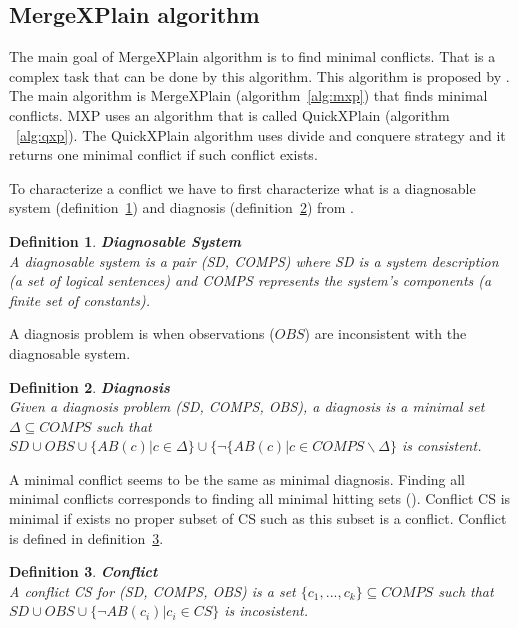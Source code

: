 \documentclass[12pt,a4paper]{article}
\newtheorem{definition}{Definition}[subsection]
\begin{document}
\subsection{MergeXPlain algorithm}
The main goal of MergeXPlain algorithm is to find minimal conflicts. That is a complex task that can be done by this algorithm. This algorithm is proposed by \citep{MXP}. The main algorithm is MergeXPlain (algorithm~\ref{alg:mxp}) that finds minimal conflicts. MXP uses an algorithm that is called QuickXPlain (algorithm ~\ref{alg:qxp}). The QuickXPlain algorithm uses divide and conquere strategy and it returns one minimal conflict if such conflict exists. 

To characterize a conflict we have to first characterize what is a diagnosable system (definition~\ref{def:diagnosableSystem}) and diagnosis (definition~\ref{def:diagnosis}) from \citep{reiterHS}.

\begin{definition}{\textbf{Diagnosable System}} \\
	\label{def:diagnosableSystem}
	\noindent A diagnosable system is a pair (SD, COMPS) where SD is a system description (a set of logical sentences) and COMPS represents the system's components (a finite set of constants).
\end{definition}

A diagnosis problem is when observations ($OBS$) are inconsistent with the diagnosable system.

\begin{definition}{\textbf{Diagnosis}} \\
	\label{def:diagnosis}
	\noindent Given a diagnosis problem (SD, COMPS, OBS), a diagnosis is a minimal set $\Delta \subseteq COMPS$ such that $SD \cup OBS \cup \{ AB(c) | c \in \Delta \} \cup \{ \neg \{AB(c) | c \in COMPS \backslash \Delta \}$ is consistent.
\end{definition}

A minimal conflict seems to be the same as minimal diagnosis. Finding all minimal conflicts corresponds to finding all minimal hitting sets (\cite{reiterHS}). Conflict CS is minimal if exists no proper subset of CS such as this subset is a conflict. Conflict is defined in definition~\ref{def:conflict}.

\newpage
\begin{definition}{\textbf{Conflict}} \\
	\label{def:conflict}
	\noindent A conflict CS for (SD, COMPS, OBS) is a set $\{c_{1}, ..., c_{k}\} \subseteq COMPS$ such that $SD \cup OBS \cup \{ \neg AB(c_{i}) | c_{i} \in CS \} $ is incosistent.
\end{definition}
\end{document}
